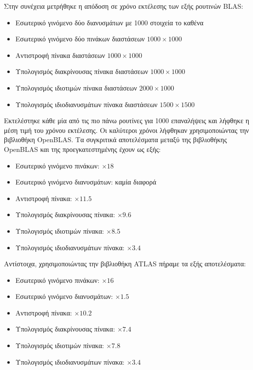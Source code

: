 Στην συνέχεια μετρήθηκε η απόδοση σε χρόνο εκτέλεσης των εξής ρουτινών BLAS:
\begin{itemize}
  \item{Εσωτερικό γινόμενο δύο διανυσμάτων με 1000 στοιχεία το καθένα}
  \item{Εσωτερικό γινόμενο δύο πινάκων διαστάσεων $1000 \times 1000$}
  \item{Αντιστροφή πίνακα διαστάσεων $1000 \times 1000$}
  \item{Υπολογισμός διακρίνουσας πίνακα διαστάσεων $1000 \times 1000$}
  \item{Υπολογισμός ιδιοτιμών πίνακα διαστάσεων $2000 \times 1000$}
  \item{Υπολογισμός ιδιοδιανυσμάτων πίνακα διαστάσεων $1500 \times 1500$}
\end{itemize}
Εκτελέστηκε κάθε μία από τις πιο πάνω ρουτίνες για 1000 επαναλήψεις και λήφθηκε
η μέση τιμή του χρόνου εκτέλεσης.
Οι καλύτεροι χρόνοι λήφθηκαν χρησιμοποιώντας την βιβλιοθήκη OpenBLAS.
Τα συγκριτικά αποτελέσματα μεταξύ της βιβλιοθήκης OpenBLAS και της προεγκατεστημένης
έχουν ως εξής: %
\begin{itemize}
  \item{Εσωτερικό γινόμενο πινάκων: $\times 18$}
  \item{Εσωτερικό γινόμενο διανυσμάτων: καμία διαφορά}
  \item{Αντιστροφή πίνακα: $\times 11.5$}
  \item{Υπολογισμός διακρίνουσας πίνακα: $\times 9.6$}
  \item{Υπολογισμός ιδιοτιμών πίνακα: $\times 8.5$}
  \item{Υπολογισμός ιδιοδιανυσμάτων πίνακα: $\times 3.4$}
\end{itemize}
Αντίστοιχα, χρησιμοποιώντας την βιβλιοθήκη ATLAS πήραμε τα εξής αποτελέσματα:
\begin{itemize}
  \item{Εσωτερικό γινόμενο πινάκων: $\times 16$}
  \item{Εσωτερικό γινόμενο διανυσμάτων: $\times 1.5$}
  \item{Αντιστροφή πίνακα: $\times 10.2$}
  \item{Υπολογισμός διακρίνουσας πίνακα: $\times 7.4$}
  \item{Υπολογισμός ιδιοτιμών πίνακα: $\times 7.8$}
  \item{Υπολογισμός ιδιοδιανυσμάτων πίνακα: $\times 3.4$}
\end{itemize}

